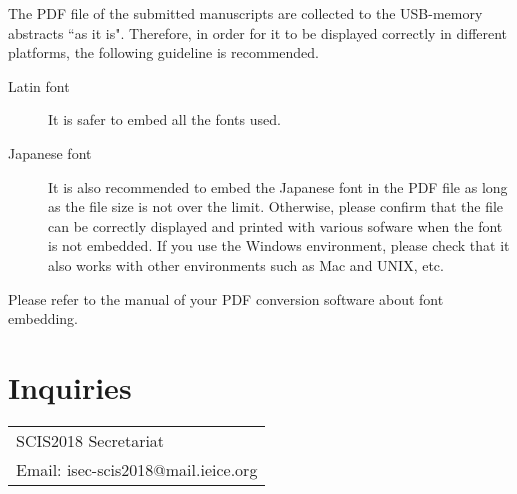 \documentclass[a4paper]{article}
\begin{document}
The PDF file of the submitted manuscripts are collected to the USB-memory abstracts ``as it is". Therefore, in order for it to be displayed correctly in different platforms,
the following guideline is recommended.

\begin{description}
 \item[Latin font]
It is safer to embed all the fonts used.
 \item[Japanese font] It is also recommended to embed the Japanese font in the PDF file as long as the file size is not over the limit.
Otherwise, please confirm that the file can be correctly displayed and printed with various sofware when the font is not embedded.
If you use the Windows environment, please check that it also works with other environments such as Mac and UNIX, etc.
\end{description}

Please refer to the manual of your PDF conversion software about font embedding.

\section{Inquiries}

\begin{tabular}{l}
SCIS2018 Secretariat \\
{\small Email: isec-scis2018@mail.ieice.org} \\
\end{tabular}

\end{document}
